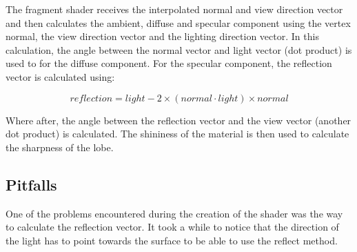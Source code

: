 \documentclass[a4paper,12pt]{article}
\begin{document}
The fragment shader receives the interpolated normal and view direction vector and then calculates the ambient, diffuse and specular component using the vertex normal, the view direction vector and the lighting direction vector. In this calculation, the angle between the normal vector and light vector (dot product) is used to for the diffuse component. For the specular component, the reflection vector is calculated using:

	\[ reflection = light-2 \times (normal \cdot light) \times normal \]

Where after, the angle between the reflection vector and the view vector (another dot product) is calculated. The shininess of the material is then used to calculate the sharpness of the lobe.

\subsection{Pitfalls}
\label{sec:PitfallsPhongShader}

One of the problems encountered during the creation of the shader was the way to calculate the reflection vector. It took a while to notice that the direction of the light has to point towards the surface to be able to use the reflect method. 

\end{document}
